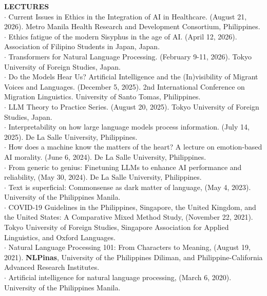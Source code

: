 \documentclass[margin]{res}
\begin{document}
\begin{resume}
\textbf{LECTURES}\\
$\cdot$ Current Issues in Ethics in the Integration of AI in Healthcare. (August 21, 2026). Metro Manila Health Research and Development Consortium, Philippines.\\
$\cdot$ Ethics fatigue of the modern Sisyphus in the age of AI. (April 12, 2026). Association of Filipino Students in Japan, Japan.\\
$\cdot$ Transformers for Natural Language Processing. (February 9-11, 2026). Tokyo University of Foreign Studies, Japan.\\
$\cdot$ Do the Models Hear Us? Artificial Intelligence and the (In)visibility of Migrant Voices and Languages. (December 5, 2025). 2nd International Conference on Migration Linguistics. University of Santo Tomas, Philippines.\\
$\cdot$ LLM Theory to Practice Series. (August 20, 2025). Tokyo University of Foreign Studies, Japan.\\
$\cdot$ Interpretability on how large language models process information. (July 14, 2025). De La Salle University, Philippines.\\
$\cdot$ How does a machine know the matters of the heart? A lecture on emotion-based AI morality. (June 6, 2024). De La Salle University, Philippines.\\
$\cdot$ From generic to genius: Finetuning LLMs to enhance AI performance and reliability, (May 30, 2024). De La Salle University, Philippines.\\
$\cdot$ Text is superficial: Commonsense as dark matter of language, (May 4, 2023). University of the Philippines Manila.\\
$\cdot$ COVID-19 Guidelines in the Philippines, Singapore, the United Kingdom, and the United States: A Comparative Mixed Method Study, (November 22, 2021). Tokyo University of Foreign Studies, Singapore Association for Applied Linguistics, and Oxford Languages.\\
$\cdot$ Natural Language Processing 101: From Characters to Meaning, (August 19, 2021). \textbf{NLPinas}, University of the Philippines Diliman, and Philippine-California Advanced Research Institutes.\\
$\cdot$ Artificial intelligence for natural language processing, (March 6, 2020). University of the Philippines Manila.


\end{resume}
\end{document}

